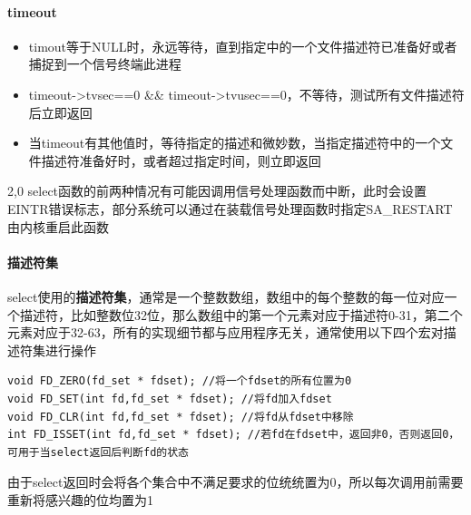 \paragraph{timeout}
\begin{itemize}
	\item[1.] timout等于NULL时，永远等待，直到指定中的一个文件描述符已准备好或者捕捉到一个信号终端此进程
	\item[2.] timeout->tv\li sec==0 \&\& timeout->tv\li usec==0，不等待，测试所有文件描述符后立即返回
	\item[3.] 当timeout有其他值时，等待指定的描述和微妙数，当指定描述符中的一个文件描述符准备好时，或者超过指定时间，则立即返回
\end{itemize}
\begin{spacing}{2,0}
select函数的前两种情况有可能因调用信号处理函数而中断，此时会设置EINTR错误标志，部分系统可以通过在装载信号处理函数时指定SA\_RESTART由内核重启此函数
\newpage
\paragraph{描述符集}
select使用的\textbf{描述符集}，通常是一个整数数组，数组中的每个整数的每一位对应一个描述符，比如整数位32位，那么数组中的第一个元素对应于描述符0-31，第二个元素对应于32-63，所有的实现细节都与应用程序无关，通常使用以下四个宏对描述符集进行操作
\begin{verbatim}
void FD_ZERO(fd_set * fdset); //将一个fdset的所有位置为0
void FD_SET(int fd,fd_set * fdset); //将fd加入fdset
void FD_CLR(int fd,fd_set * fdset); //将fd从fdset中移除
int FD_ISSET(int fd,fd_set * fdset); //若fd在fdset中，返回非0，否则返回0，可用于当select返回后判断fd的状态
\end{verbatim}
由于select返回时会将各个集合中不满足要求的位统统置为0，所以每次调用前需要重新将感兴趣的位均置为1


\end{spacing}

